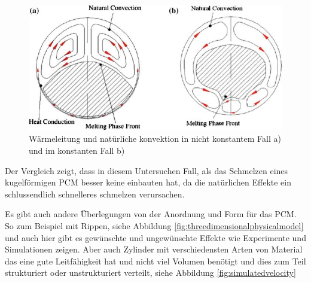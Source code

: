 \documentclass[11pt,a4paper]{scrartcl}
\begin{document}
\begin{figure}[h!]
\begin{center}
\includegraphics[scale=0.6]{images/heatconductionin.jpg}
\caption{Wärmeleitung und natürliche konvektion in nicht konstantem Fall a) und im konstanten Fall b) \cite{WasteEnergyHarvesting}}
\label{fig:heatconductionin}
\end{center}
\end{figure}

Der Vergleich zeigt, dass in diesem Untersuchen Fall, als das Schmelzen eines kugelförmigen PCM besser keine einbauten hat, da die natürlichen Effekte ein schlussendlich schnelleres schmelzen verursachen.

Es gibt auch andere Überlegungen von der Anordnung und Form für das PCM. So zum Beispiel mit Rippen, siehe Abbildung \ref{fig:threedimensionalphysicalmodel} und auch hier gibt es gewünschte und ungewünschte Effekte wie Experimente und Simulationen zeigen. Aber auch Zylinder mit verschiedensten Arten von Material das eine gute Leitfähigkeit hat und nicht viel Volumen benötigt und dies zum Teil strukturiert oder unstrukturiert verteilt, siehe Abbildung \ref{fig:simulatedvelocity}
\end{document}
